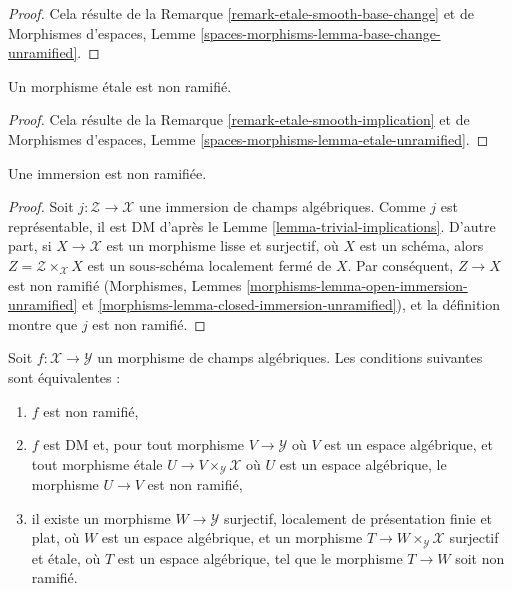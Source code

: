 \begin{proof}
Cela r\'esulte de
la Remarque \ref{remark-etale-smooth-base-change}
et de
Morphismes d'espaces, Lemme \ref{spaces-morphisms-lemma-base-change-unramified}.
\end{proof}

\begin{lemma}
\label{lemma-etale-unramified}
Un morphisme \'etale est non ramifi\'e.
\end{lemma}

\begin{proof}
Cela r\'esulte de la Remarque \ref{remark-etale-smooth-implication}
et de Morphismes d'espaces, Lemme
\ref{spaces-morphisms-lemma-etale-unramified}.
\end{proof}

\begin{lemma}
\label{lemma-immersion-unramified}
Une immersion est non ramifi\'ee.
\end{lemma}

\begin{proof}
Soit $j : \mathcal{Z} \to \mathcal{X}$ une immersion de
champs alg\'ebriques. Comme $j$ est repr\'esentable, il est DM d'apr\`es le
Lemme \ref{lemma-trivial-implications}. D'autre part,
si $X \to \mathcal{X}$ est un morphisme lisse et surjectif,
o\`u $X$ est un sch\'ema, alors $Z = \mathcal{Z} \times_\mathcal{X} X$
est un sous-sch\'ema localement ferm\'e de $X$. Par cons\'equent, $Z \to X$
est non ramifi\'e (Morphismes, Lemmes \ref{morphisms-lemma-open-immersion-unramified} et
\ref{morphisms-lemma-closed-immersion-unramified}),
et la d\'efinition montre que $j$ est non ramifi\'e.
\end{proof}

\begin{lemma}
\label{lemma-unramified}
Soit $f : \mathcal{X} \to \mathcal{Y}$ un morphisme de champs alg\'ebriques.
Les conditions suivantes sont \'equivalentes :
\begin{enumerate}
\item $f$ est non ramifi\'e,
\item $f$ est DM et, pour tout morphisme $V \to \mathcal{Y}$
o\`u $V$ est un espace alg\'ebrique, et tout morphisme \'etale
$U \to V \times_\mathcal{Y} \mathcal{X}$ o\`u $U$ est un espace alg\'ebrique,
le morphisme $U \to V$ est non ramifi\'e,
\item il existe un morphisme $W \to \mathcal{Y}$ surjectif,
localement de pr\'esentation finie et plat, o\`u $W$ est un espace alg\'ebrique,
et un morphisme $T \to W \times_\mathcal{Y} \mathcal{X}$ surjectif et \'etale,
o\`u $T$ est un espace alg\'ebrique, tel que le morphisme $T \to W$ soit non ramifi\'e.
\end{enumerate}
\end{lemma}

